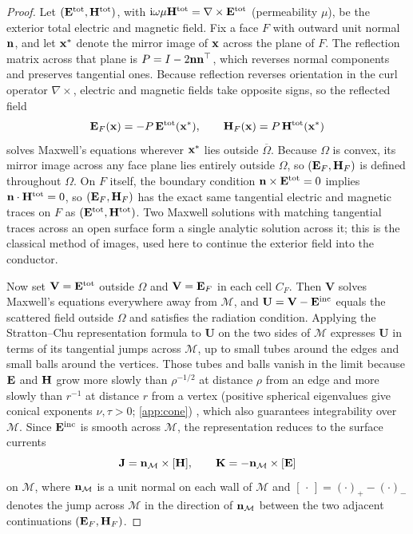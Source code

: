 \begin{proof}
Let $(\mathbf{E}^{\mathrm{tot}},\mathbf{H}^{\mathrm{tot}})$, with $\mathrm{i}\omega\mu\mathbf{H}^{\mathrm{tot}} = \nabla\times\mathbf{E}^{\mathrm{tot}}$ (permeability $\mu$), be the exterior total electric and magnetic field. Fix a face $F$ with outward unit normal $\mathbf{n}$, and let $\mathbf{x}^*$ denote the mirror image of $\mathbf{x}$ across the plane of $F$. The reflection matrix across that plane is $P = I - 2\mathbf{n}\mathbf{n}^{\top}$, which reverses normal components and preserves tangential ones. Because reflection reverses orientation in the curl operator $\nabla\times$, electric and magnetic fields take opposite signs, so the reflected field
\begin{equation}
  \mathbf{E}_F(\mathbf{x}) = -P\,\mathbf{E}^{\mathrm{tot}}(\mathbf{x}^*), \qquad \mathbf{H}_F(\mathbf{x}) = P\,\mathbf{H}^{\mathrm{tot}}(\mathbf{x}^*)
\end{equation}
solves Maxwell's equations wherever $\mathbf{x}^*$ lies outside $\overline{\Omega}$. Because $\Omega$ is convex, its mirror image across any face plane lies entirely outside $\Omega$, so $(\mathbf{E}_F,\mathbf{H}_F)$ is defined throughout $\Omega$. On $F$ itself, the boundary condition $\mathbf{n}\times\mathbf{E}^{\mathrm{tot}} = 0$ implies $\mathbf{n}\cdot\mathbf{H}^{\mathrm{tot}} = 0$, so $(\mathbf{E}_F,\mathbf{H}_F)$ has the exact same tangential electric and magnetic traces on $F$ as $(\mathbf{E}^{\mathrm{tot}},\mathbf{H}^{\mathrm{tot}})$. Two Maxwell solutions with matching tangential traces across an open surface form a single analytic solution across it; this is the classical method of images, used here to continue the exterior field into the conductor.

Now set $\mathbf{V} = \mathbf{E}^{\mathrm{tot}}$ outside $\Omega$ and $\mathbf{V} = \mathbf{E}_F$ in each cell $C_F$. Then $\mathbf{V}$ solves Maxwell's equations everywhere away from $\mathcal{M}$, and $\mathbf{U} = \mathbf{V} - \mathbf{E}^{\mathrm{inc}}$ equals the scattered field outside $\Omega$ and satisfies the radiation condition. Applying the Stratton--Chu representation formula \cite{colton2013} to $\mathbf{U}$ on the two sides of $\mathcal{M}$ expresses $\mathbf{U}$ in terms of its tangential jumps across $\mathcal{M}$, up to small tubes around the edges and small balls around the vertices. Those tubes and balls vanish in the limit because $\mathbf{E}$ and $\mathbf{H}$ grow more slowly than $\rho^{-1/2}$ at distance $\rho$ from an edge and more slowly than $r^{-1}$ at distance $r$ from a vertex (positive spherical eigenvalues give conical exponents $\nu,\tau>0$; \ref{app:cone}) \cite{meixner1972,costabel2000}, which also guarantees integrability over $\mathcal{M}$. Since $\mathbf{E}^{\mathrm{inc}}$ is smooth across $\mathcal{M}$, the representation reduces to the surface currents
\begin{equation}
  \mathbf{J} = \mathbf{n}_{\mathcal{M}}\times[\mathbf{H}], \qquad \mathbf{K} = -\mathbf{n}_{\mathcal{M}}\times[\mathbf{E}]
  \label{eq:jumps}
\end{equation}
on $\mathcal{M}$, where $\mathbf{n}_{\mathcal{M}}$ is a unit normal on each wall of $\mathcal{M}$ and $[\,\cdot\,] = (\cdot)_+ - (\cdot)_-$ denotes the jump across $\mathcal{M}$ in the direction of $\mathbf{n}_{\mathcal{M}}$ between the two adjacent continuations $(\mathbf{E}_F,\mathbf{H}_F)$.
\end{proof}

